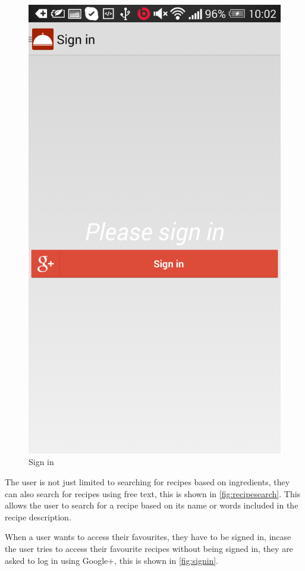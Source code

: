 \begin{figure}[H]
\begin{minipage}[t]{0.5\columnwidth}
\centering
\includegraphics[width=0.7\columnwidth]{img/screenshots/finalsignin.png}
\caption{Sign in\label{fig:signin}}
\end{minipage}
\end{figure}

The user is not just limited to searching for recipes based on ingredients, they can also search for recipes using free text, this is shown in \autoref{fig:recipesearch}. This allows the user to search for a recipe based on its name or words included in the recipe description. 

When a user wants to access their favourites, they have to be signed in, incase the user tries to access their favourite recipes without being signed in, they are asked to log in using Google+, this is shown in \autoref{fig:signin}.

